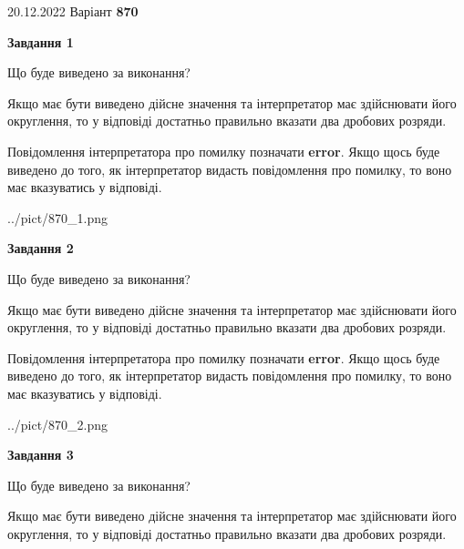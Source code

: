 \documentclass[12pt, ukrainian]{article}
\begin{document}
{20.12.2022 Варіант \No \textbf { 870 }\par}
{
\begin {Large}

{\begin {center}\textbf{Завдання 1}\end {center}}\par
Що буде виведено за виконання? \par

Якщо має бути виведено дійсне значення та інтерпретатор має здійснювати його округлення, 
то у відповіді достатньо правильно вказати два дробових розряди.

Повідомлення інтерпретатора про помилку позначати \textbf{error}.
Якщо щось буде виведено до того, як інтерпретатор видасть повідомлення про помилку, 
то воно має вказуватись у відповіді. \par

\begin{center}
	{../pict/870_1.png}
\end{center}
\newpage

{\begin {center}\textbf{Завдання 2}\end {center}}\par
Що буде виведено за виконання? \par

Якщо має бути виведено дійсне значення та інтерпретатор має здійснювати його округлення, 
то у відповіді достатньо правильно вказати два дробових розряди.

Повідомлення інтерпретатора про помилку позначати \textbf{error}.
Якщо щось буде виведено до того, як інтерпретатор видасть повідомлення про помилку, 
то воно має вказуватись у відповіді. \par

\begin{center}
	{../pict/870_2.png}
\end{center}
\newpage

{\begin {center}\textbf{Завдання 3}\end {center}}\par
Що буде виведено за виконання? \par

Якщо має бути виведено дійсне значення та інтерпретатор має здійснювати його округлення, 
то у відповіді достатньо правильно вказати два дробових розряди.


\end{Large}}
\end{document}
